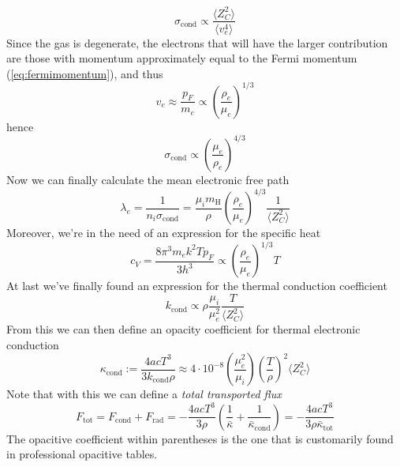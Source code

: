 \begin{equation*}
	\sigma_{\text{cond}} \propto \frac{\langle Z_{C}^{2} \rangle}{\langle v_{e}^{4} \rangle}
\end{equation*} 
Since the gas is degenerate, the electrons that will have the larger contribution are those with momentum approximately equal to the Fermi momentum (\ref{eq:fermimomentum}), and thus 
\begin{equation*}
	v_{e}\approx \frac{p_{F}}{m_{e}}\propto \left(\frac{\rho_{e}}{\mu_{e}}\right)^{1/3}
\end{equation*}
hence 
\begin{equation*}
	\sigma_{\text{cond}} \propto \left(\frac{\mu_{e}}{\rho_{e}}\right)^{4/3}
\end{equation*}
Now we can finally calculate the mean electronic free path 
\begin{equation*}
	\lambda_{e} = \frac{1}{n_{i}\sigma_{\text{cond}}} = \frac{\mu_{i}m_{\text{H}}}{\rho}\left(\frac{\rho_{e}}{\mu_{e}}\right)^{4/3}\frac{1}{\langle Z_{C}^{2}\rangle}
\end{equation*}
Moreover, we're in the need of an expression for the specific heat
\begin{equation*}
	c_{V} = \frac{8\pi^{3}m_{e}k^{2}Tp_{F}}{3h^{3}}\propto \left(\frac{\rho_{e}}{\mu_{e}}\right)^{1/3}T
\end{equation*}
At last we've finally found an expression for the thermal conduction coefficient
\begin{equation*}
	k_{\text{cond}} \propto \rho\frac{\mu_{i}}{\mu_{e}^{2}}\frac{T}{\langle Z_{C}^{2}\rangle}
\end{equation*}
From this we can then define an opacity coefficient for thermal electronic conduction 
\begin{equation}
	\kappa_{\text{cond}}:= \frac{4ac T^{3}}{3k_{\text{cond}}\rho} \approx 4\cdot 10^{-8}\left(\frac{\mu_{e}^{2}}{\mu_{i}}\right)\left(\frac{T}{\rho}\right)^{2}\langle Z_{C}^{2}\rangle
\end{equation}
Note that with this we can define a \emph{total transported flux}
\begin{equation*}
	F_{\text{tot}} = F_{\text{cond}}+F_{\text{rad}} = -\frac{4acT^{3}}{3\rho}\left(\frac{1}{\bar{\kappa}}+\frac{1}{\bar{\kappa}_{\text{cond}}}\right) = -\frac{4acT^{3}}{3\rho\bar{\kappa}_{\text{tot}}}
\end{equation*}
The opacitive coefficient within parentheses is the one that is customarily found in professional opacitive tables.